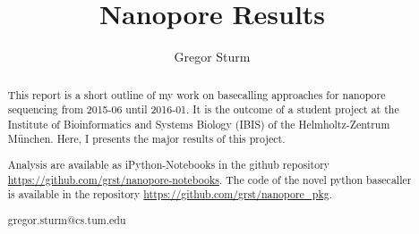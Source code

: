 \documentclass[]{scrartcl}
\title{Nanopore Results %
}
\author{Gregor Sturm}
\begin{document}
\maketitle

\begin{abstract}
\begin{description}
\item This report is a short outline of my work on basecalling approaches for nanopore sequencing from 2015-06 until 2016-01. It is the outcome of a student project at the Institute of Bioinformatics and Systems Biology (IBIS) of the Helmholtz-Zentrum München. Here, I presents the major results of this project. 
\item [Availability] Analysis are available as iPython-Notebooks in the github repository \url{https://github.com/grst/nanopore-notebooks}. The code of the novel python basecaller is available in the repository \url{https://github.com/grst/nanopore\_pkg}. 
\item [Contact] gregor.sturm@cs.tum.edu
\end{description}

\end{abstract}
\end{document}
